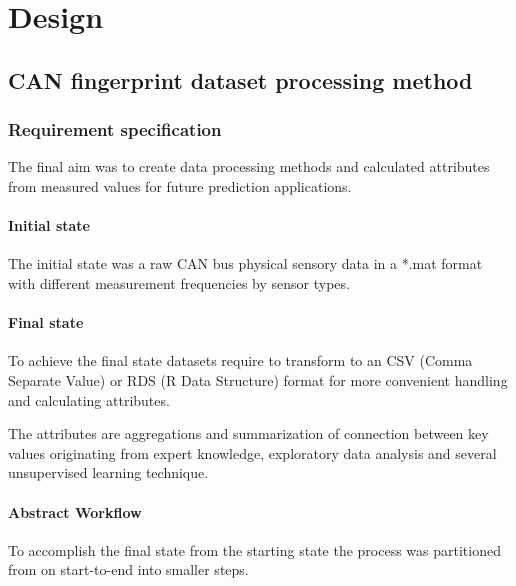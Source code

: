 \chapter{Design}
\section{CAN fingerprint dataset processing method}
\subsection{Requirement specification}
	\noindent
The final aim was to create data processing methods and calculated attributes from measured values for future prediction applications.
	\subsubsection{Initial state}
The initial state was a raw CAN bus physical sensory data in a *.mat format with different measurement frequencies by sensor types.
	\subsubsection{Final state}
To achieve the final state datasets require to transform to an CSV (Comma Separate Value) or RDS (R Data Structure) format for more convenient handling and calculating attributes.

The attributes are aggregations and summarization of connection between key values originating from expert knowledge, exploratory data analysis and several unsupervised learning technique.
\subsubsection{Abstract Workflow}
To accomplish the final state from the starting state the process was partitioned from on start-to-end into smaller steps. 

